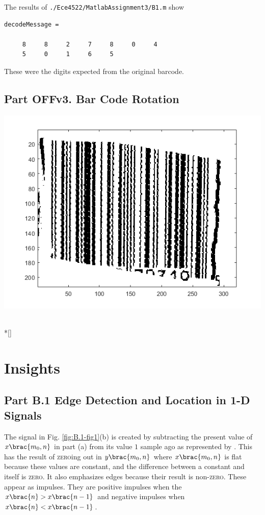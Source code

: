 \documentclass[conference]{../lib/IEEEtran}
\renewenvironment*{figure}[1][]
    {
        \minipage{\linewidth}
    }
    {
        \endminipage
        \\*[\intextsep]
    }
\DeclarePairedDelimiter\brac[]%
\newcommand*\tbrao[1]{(#1)}
\begin{document}
The results of \texttt{./Ece4522/MatlabAssignment3/B1.m} show
\begin{verbatim}
decodeMessage =

     8     8     2     7     8     0     4
     5     0     1     6     5
\end{verbatim}

These were the digits expected from the original barcode.

\subsection{Part OFFv3. Bar Code Rotation}

\begin{figure}
    \centering
    \includegraphics[width=\linewidth]{unrotV3.png}
    \label{fig:rotation}
\end{figure}

\section{Insights}

\subsection{Part B.1 Edge Detection and Location in 1-D Signals}

The signal in Fig. \ref{fig:B.1-fig1}(b) is created by subtracting the present value of \(x\brac{m_0, n}\) in part (a) from its value \(1\) sample ago as represented by \tbrao{\ref{eqn:bdn}}. This has the result of \textsc{zero}ing out in \(y\brac{m_0, n}\) where \(x\brac{m_0, n}\) is flat because these values are constant, and the difference between a constant and itself is \textsc{zero}. It also emphasizes edges because their result is non-\textsc{zero}. These appear as impulses. They are positive impulses when the \(x\brac{n} > x\brac{n - 1}\) and negative impulses when \(x\brac{n} < x\brac{n - 1}\).
\end{document}
